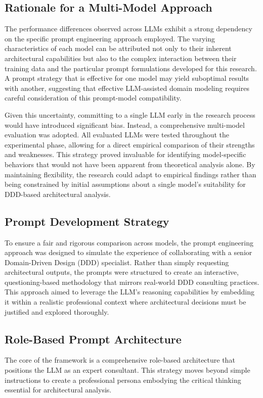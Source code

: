 \subsection{Rationale for a Multi-Model Approach}
The performance differences observed across LLMs exhibit a strong dependency on the specific prompt engineering approach employed. The varying characteristics of each model can be attributed not only to their inherent architectural capabilities but also to the complex interaction between their training data and the particular prompt formulations developed for this research. A prompt strategy that is effective for one model may yield suboptimal results with another, suggesting that effective LLM-assisted domain modeling requires careful consideration of this prompt-model compatibility.

Given this uncertainty, committing to a single LLM early in the research process would have introduced significant bias. Instead, a comprehensive multi-model evaluation was adopted. All evaluated LLMs were tested throughout the experimental phase, allowing for a direct empirical comparison of their strengths and weaknesses. This strategy proved invaluable for identifying model-specific behaviors that would not have been apparent from theoretical analysis alone. By maintaining flexibility, the research could adapt to empirical findings rather than being constrained by initial assumptions about a single model's suitability for DDD-based architectural analysis.

\subsection{Prompt Development Strategy}
To ensure a fair and rigorous comparison across models, the prompt engineering approach was designed to simulate the experience of collaborating with a senior Domain-Driven Design (DDD) specialist. Rather than simply requesting architectural outputs, the prompts were structured to create an interactive, questioning-based methodology that mirrors real-world DDD consulting practices. This approach aimed to leverage the LLM's reasoning capabilities by embedding it within a realistic professional context where architectural decisions must be justified and explored thoroughly.

\subsection{Role-Based Prompt Architecture}
The core of the framework is a comprehensive role-based architecture that positions the LLM as an expert consultant. This strategy moves beyond simple instructions to create a professional persona embodying the critical thinking essential for architectural analysis.

